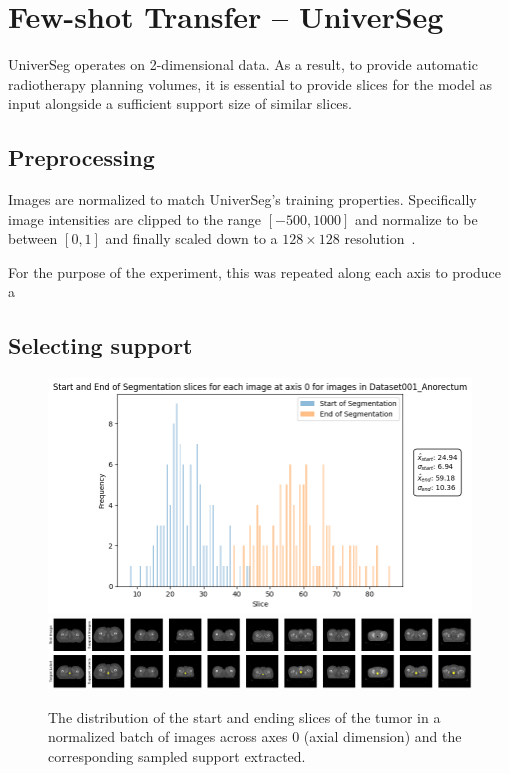 \documentclass[12pt,twoside]{report}
\begin{document}
\section{Few-shot Transfer -- UniverSeg}

UniverSeg operates on 2-dimensional data. As a result, to provide automatic radiotherapy planning volumes, it is essential to provide slices for the model as input alongside a sufficient support size of similar slices. 

\subsection{Preprocessing}

Images are normalized to match UniverSeg's training properties. Specifically image intensities are clipped to the range $[-500, 1000]$ and normalize to be between $[0,1]$ and finally scaled down to a $128 \times 128$ resolution~\cite{universeg}.

For the purpose of the experiment, this was repeated along each axis to produce a

\subsection{Selecting support}

\begin{figure}[H]
  \centering
  \includegraphics[width=.8\linewidth]{../../research/source/code/UniverSeg/start_end_distribution_axis_0_anorectum.png}
  \includegraphics[width=\linewidth, trim=0 0 340px 0, clip]{../../research/source/code/UniverSeg/support_anorectum_axis_0.png}
  \caption{The distribution of the start and ending slices of the tumor in a normalized batch of images across axes 0 (axial dimension) and the corresponding sampled support extracted.}\label{fig:start-end-distribution-universeg}
\end{figure}
\end{document}
